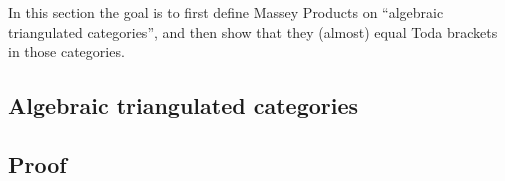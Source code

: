 In this section the goal is to first define Massey Products on ``algebraic triangulated categories'', and then show that they (almost) equal Toda brackets in those categories.

\subsection{Algebraic triangulated categories}


\subsection{Proof}
